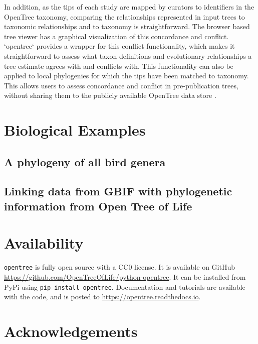 \documentclass[oupdraft]{sysbio_sse}
\begin{document}
In addition, as the tips of each study are mapped by curators to identifiers in the OpenTree taxonomy, comparing the relationships represented in input trees to taxonomic relationships and to taxonomy is straightforward. The browser based tree viewer has a graphical visualization of this concordance and conflict. `opentree` provides a wrapper for this conflict functionality, which makes it straightforward to assess what taxon definitions and evolutionary relationships a tree estimate agrees with and conflicts with. This functionality can also be applied to local phylogenies for which the tips have been matched to taxonomy. This allows users to assess concordance and conflict in pre-publication trees, without sharing them to the publicly available OpenTree data store \citep{mctavish_phylesystem}.



\bigskip

\section{Biological Examples}
\label{sec4}

\subsection{A phylogeny of all bird genera}


\subsection{Linking data from GBIF with phylogenetic information from Open Tree of Life}

\bigskip

\section{Availability}
\label{sec5}

\texttt{opentree} is fully open source with a CC0 license. It is available on GitHub \url{ https://github.com/OpenTreeOfLife/python-opentree}. It can be installed from PyPi using \texttt{pip install opentree}. Documentation and tutorials are available with the code, and is posted to \url{https://opentree.readthedocs.io}.

\section{Acknowledgements}
\end{document}
